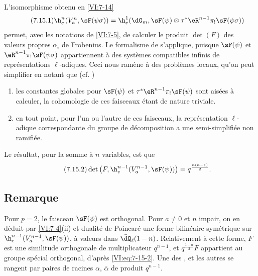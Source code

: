 L'isomorphisme obtenu en \ref{VI:7-14} 
\begin{equation*}\tag{7.15.1}\label{VI:eq:7-15-1}
  \h_c^n(V_a^n,\sF(\psi\sigma)) = \h_c^1(\dG_m,\sF(\psi)\otimes \tau^\ast \eR^{n-1} \pi_! \sF(\psi\sigma)) 
\end{equation*}
permet, avec les notations de \ref{VI:7-5}, de calculer le produit $\det(F)$ 
des valeurs propres $\alpha_i$ de Frobenius. Le formalisme de \cite{de73} 
s'applique, puisque $\sF(\psi)$ et $\eR^{n-1} \pi_! \sF(\psi\sigma)$ 
appartiennent à des systèmes compatibles infinis de représentations 
$\ell$-adiques. Ceci nous ramène à des problèmes locaux, qu'on peut 
simplifier en notant que (cf. \cite[9.5]{de73}) 
\begin{enumerate}[\indent a)]
  \item les constantes globales pour 
    $\sF(\psi)$ et $\tau^\ast \eR^{n-1} \pi_! \sF(\psi)$ sont aisées à 
    calculer, la cohomologie de ces faisceaux étant de nature triviale. 
  \item en tout point, pour l'un ou l'autre de ces faisceaux, la 
    représentation $\ell$-adique correspondante du groupe de décomposition 
    a une semi-simplifiée non ramifiée. 
\end{enumerate}

Le résultat, pour la somme à $n$ variables, est que 
\begin{equation*}\tag{7.15.2}\label{VI:eq:7-15-2}
  \det\left(F,\h_c^{n-1}(V_a^{n-1},\sF(\psi))\right) = q^{\frac{n(n-1)}{2}} \text{.} 
\end{equation*}





\subsection{Remarque}\label{VI:7-16}

Pour $p=2$, le faisceau $\sF(\psi)$ est orthogonal. Pour $a\ne 0$ et $n$ 
impair, on en déduit par \ref{VI:7-4}(ii) et dualité de Poincaré une 
forme bilinéaire symétrique sur $\h_c^{n-1}(V_a^{n-1},\sF(\psi))$, à 
valeurs dans $\bar\dQ_\ell(1-n)$. Relativement à cette forme, $F$ est une 
similitude orthogonale de multiplicateur $q^{n-1}$, et $q^{\frac{1-n}{2}} F$ 
appartient au groupe spécial orthogonal, d'après \eqref{VI:eq:7-15-2}. Une 
des , et les autres se 
rangent par paires de racines $\alpha$, $\bar\alpha$ de produit $q^{n-1}$. 

